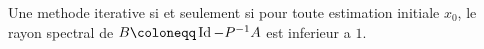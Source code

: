 \documentclass[../main.tex]{subfiles}
\begin{document}
\begin{thm}
	Une methode iterative si et seulement si pour toute estimation initiale $x_0$, le rayon spectral de $B \coloneqq \id - P^{-1}A$ est inferieur a $1$.
\end{thm}
\end{document}
